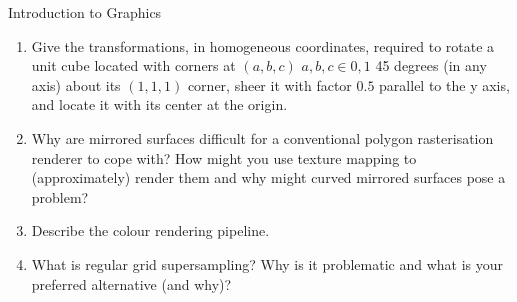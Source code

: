 \documentclass{tripos}
\begin{document}
\begin{question}[MockIA,year=2025,paper=1,question=6,author=rrw]{Introduction to Graphics}

\begin{enumerate}
\item Give the transformations, in homogeneous coordinates, required
  to rotate a unit cube located with corners at $(a,b,c)$ $a,b,c \in
  0,1$ 45 degrees (in any axis) about its $(1,1,1)$ corner, sheer it
  with factor $0.5$ parallel to the y axis, and locate it with its
  center at the origin. 

\item Why are mirrored surfaces difficult for a conventional polygon
  rasterisation renderer to cope with?  How might you use texture
  mapping to (approximately) render them and why might curved mirrored
  surfaces pose a problem? 

\item Describe the colour rendering pipeline. 

\item What is regular grid supersampling? Why is it problematic and
  what is your preferred alternative (and why)?  

\end{enumerate}
\end{question}
\eject
\end{document}
